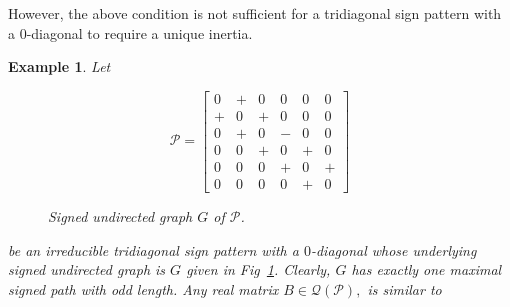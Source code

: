 \documentclass[10pt,a4paper]{amsart}
\newtheorem{eg}{Example}[section]
\numberwithin{equation}{section}
\begin{document}
	However, the above condition is not sufficient for a tridiagonal sign pattern with a $0$-diagonal to require a unique inertia. 
	\begin{eg} \label{neg11}
		Let       
		\begin{figure}[H]
			\centering
			\begin{minipage}{.45\textwidth}
				\vspace{-1cm}
				\[
				\mathcal{P}=\begin{bmatrix}
					0 & + & 0 & 0 & 0 & 0 \\
					+ & 0 & + & 0 & 0 & 0 \\
					0 & + & 0 & - & 0 & 0 \\
					0 & 0 & + & 0 & + & 0 \\
					0 & 0 & 0 & + & 0 & + \\
					0 & 0 & 0 & 0 & + & 0
				\end{bmatrix}
				\]
			\end{minipage}
			\hspace{0.05\textwidth}
			\begin{minipage}{.45\textwidth}
				\centering
				\tikzset{node distance=1cm}
				\caption{Signed undirected graph $ G$ of $\mathcal{P}$.}
				\label{xnfig11}
			\end{minipage}
		\end{figure}
	be an irreducible tridiagonal sign pattern with a $0$-diagonal whose underlying signed undirected graph is $G$ given in Fig~\ref{xnfig11}. Clearly, $G$ has exactly one maximal signed path with odd length. Any real matrix $B\in \mathcal{Q}(\mathcal{P}),$ is similar to
	

\end{eg}
\end{document}

